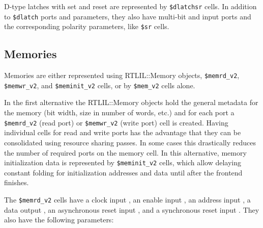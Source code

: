 D-type latches with set and reset are represented by {\tt \$dlatchsr} cells.
In addition to {\tt \$dlatch} ports and parameters, they also have multi-bit
 and  input ports and the corresponding polarity parameters, like
{\tt \$sr} cells.

\subsection{Memories}
\label{sec:memcells}

Memories are either represented using RTLIL::Memory objects, {\tt \$memrd\_v2}, {\tt \$memwr\_v2}, and {\tt \$meminit\_v2}
cells, or by {\tt \$mem\_v2} cells alone.

In the first alternative the RTLIL::Memory objects hold the general metadata for the memory (bit width,
size in number of words, etc.) and for each port a {\tt \$memrd\_v2} (read port) or {\tt \$memwr\_v2} (write port)
cell is created. Having individual cells for read and write ports has the advantage that they can be
consolidated using resource sharing passes. In some cases this drastically reduces the number of required
ports on the memory cell. In this alternative, memory initialization data is represented by {\tt \$meminit\_v2} cells,
which allow delaying constant folding for initialization addresses and data until after the frontend finishes.

The {\tt \$memrd\_v2} cells have a clock input , an enable input , an
address input , a data output , an asynchronous reset input ,
and a synchronous reset input . They also have the following parameters:

